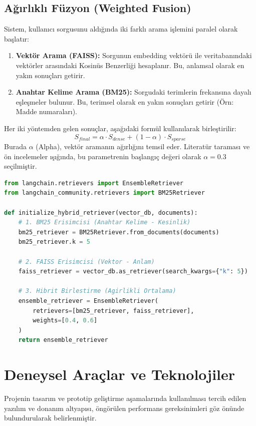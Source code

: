 \documentclass[12pt,a4paper]{report}
\begin{document}
\subsection{Ağırlıklı Füzyon (Weighted Fusion)}
Sistem, kullanıcı sorgusunu aldığında iki farklı arama işlemini paralel olarak başlatır:
\begin{enumerate}
    \item \textbf{Vektör Arama (FAISS):} Sorgunun embedding vektörü ile veritabanındaki vektörler arasındaki Kosinüs Benzerliği hesaplanır. Bu, anlamsal olarak en yakın sonuçları getirir.
    \item \textbf{Anahtar Kelime Arama (BM25):} Sorgudaki terimlerin frekansına dayalı eşleşmeler bulunur. Bu, terimsel olarak en yakın sonuçları getirir (Örn: Madde numaraları).
\end{enumerate}

Her iki yöntemden gelen sonuçlar, aşağıdaki formül kullanılarak birleştirilir:
\begin{equation}
    S_{final} = \alpha \cdot S_{dense} + (1 - \alpha) \cdot S_{sparse}
\end{equation}
Burada $\alpha$ (Alpha), vektör aramanın ağırlığını temsil eder. Literatür taraması ve ön incelemeler ışığında, bu parametrenin başlangıç değeri olarak $\alpha = 0.3$ seçilmiştir.

\begin{lstlisting}[language=Python, caption=Hibrit Arama İçin Öngörülen Kod Yapısı]
from langchain.retrievers import EnsembleRetriever
from langchain_community.retrievers import BM25Retriever

def initialize_hybrid_retriever(vector_db, documents):
    # 1. BM25 Erisimcisi (Anahtar Kelime - Kesinlik)
    bm25_retriever = BM25Retriever.from_documents(documents)
    bm25_retriever.k = 5
    
    # 2. FAISS Erisimcisi (Vektor - Anlam)
    faiss_retriever = vector_db.as_retriever(search_kwargs={"k": 5})
    
    # 3. Hibrit Birlestirme (Agirlikli Ortalama)
    ensemble_retriever = EnsembleRetriever(
        retrievers=[bm25_retriever, faiss_retriever],
        weights=[0.4, 0.6] 
    )
    return ensemble_retriever
\end{lstlisting}

\section{Deneysel Araçlar ve Teknolojiler}
Projenin tasarım ve prototip geliştirme aşamalarında kullanılması tercih edilen yazılım ve donanım altyapısı, öngörülen performans gereksinimleri göz önünde bulundurularak belirlenmiştir.
\end{document}
